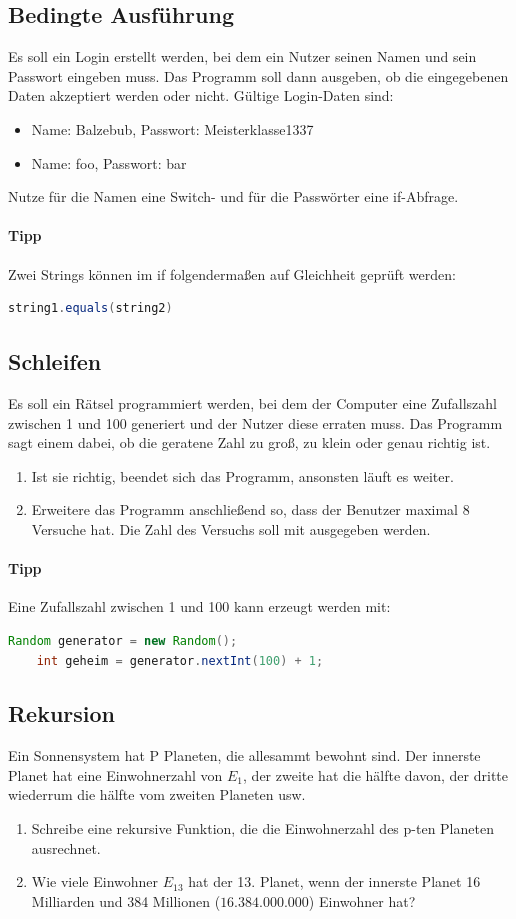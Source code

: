 \documentclass[11pt, a4paper]{article}
\begin{document}
\subsection{Bedingte Ausführung}
Es soll ein Login erstellt werden, bei dem ein Nutzer seinen Namen und sein Passwort eingeben muss. Das Programm soll dann ausgeben, ob die eingegebenen Daten akzeptiert werden oder nicht. Gültige Login-Daten sind:
\begin{itemize}
	\item Name: Balzebub, Passwort: Meisterklasse1337
	\item Name: foo, Passwort: bar
\end{itemize}
Nutze für die Namen eine Switch- und für die Passwörter eine if-Abfrage.
\paragraph{Tipp} Zwei Strings können im if folgendermaßen auf Gleichheit geprüft werden:
\begin{lstlisting}[language=Java, tabsize=4]
	string1.equals(string2)
\end{lstlisting}

\subsection{Schleifen}
Es soll ein Rätsel programmiert werden, bei dem der Computer eine Zufallszahl zwischen 1 und 100 generiert und der Nutzer diese erraten muss. Das Programm sagt einem dabei, ob die geratene Zahl zu groß, zu klein oder genau richtig ist.
\begin{enumerate}
	\item Ist sie richtig, beendet sich das Programm, ansonsten läuft es weiter.
	\item Erweitere das Programm anschließend so, dass der Benutzer maximal 8 Versuche hat. Die Zahl des Versuchs soll mit ausgegeben werden.
\end{enumerate}
\paragraph{Tipp} Eine Zufallszahl zwischen 1 und 100 kann erzeugt werden mit:
\begin{lstlisting}[language=Java]
	Random generator = new Random();
	int geheim = generator.nextInt(100) + 1;
\end{lstlisting}

\subsection{Rekursion}
Ein Sonnensystem hat P Planeten, die allesammt bewohnt sind. Der innerste Planet hat eine Einwohnerzahl von $E_1$, der zweite hat die hälfte davon, der dritte wiederrum die hälfte vom zweiten Planeten usw.
\begin{enumerate}
	\item Schreibe eine rekursive Funktion, die die Einwohnerzahl des p-ten Planeten ausrechnet.
	\item Wie viele Einwohner $E_{13}$ hat der 13. Planet, wenn der innerste Planet 16 Milliarden und 384 Millionen ($16.384.000.000$) Einwohner hat?
\end{enumerate}
\end{document}
